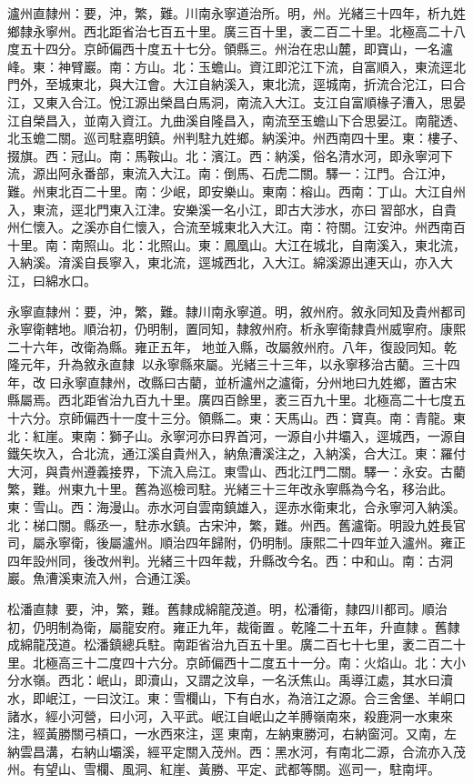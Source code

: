 \begin{pinyinscope}
瀘州直隸州：要，沖，繁，難。川南永寧道治所。明，州。光緒三十四年，析九姓鄉隸永寧州。西北距省治七百五十里。廣三百十里，袤二百二十里。北極高二十八度五十四分。京師偏西十度五十七分。領縣三。州治在忠山麓，即寶山，一名瀘峰。東：神臂巖。南：方山。北：玉蟾山。資江即沱江下流，自富順入，東流逕北門外，至城東北，與大江會。大江自納溪入，東北流，逕城南，折流合沱江，曰合江，又東入合江。悅江源出榮昌白馬洞，南流入大江。支江自富順椽子漕入，思晏江自榮昌入，並南入資江。九曲溪自隆昌入，南流至玉蟾山下合思晏江。南龍透、北玉蟾二關。巡司駐嘉明鎮。州判駐九姓鄉。納溪沖。州西南四十里。東：樓子、掇旗。西：冠山。南：馬鞍山。北：濱江。西：納溪，俗名清水河，即永寧河下流，源出阿永番部，東流入大江。南：倒馬、石虎二關。驛一：江門。合江沖，難。州東北百二十里。南：少岷，即安樂山。東南：榕山。西南：丁山。大江自州入，東流，逕北門東入江津。安樂溪一名小江，即古大涉水，亦曰習部水，自貴州仁懷入。之溪亦自仁懷入，合流至城東北入大江。南：符關。江安沖。州西南百十里。南：南照山。北：北照山。東：鳳凰山。大江在城北，自南溪入，東北流，入納溪。淯溪自長寧入，東北流，逕城西北，入大江。綿溪源出連天山，亦入大江，曰綿水口。

永寧直隸州：要，沖，繁，難。隸川南永寧道。明，敘州府。敘永同知及貴州都司永寧衛轄地。順治初，仍明制，置同知，隸敘州府。析永寧衛隸貴州威寧府。康熙二十六年，改衛為縣。雍正五年，地並入縣，改屬敘州府。八年，復設同知。乾隆元年，升為敘永直隸，以永寧縣來屬。光緒三十三年，以永寧移治古藺。三十四年，改曰永寧直隸州，改縣曰古藺，並析瀘州之瀘衛，分州地曰九姓鄉，置古宋縣屬焉。西北距省治九百九十里。廣四百餘里，袤三百九十里。北極高二十七度五十六分。京師偏西十一度十三分。領縣二。東：天馬山。西：寶真。南：青龍。東北：紅崖。東南：獅子山。永寧河亦曰界首河，一源自小井壩入，逕城西，一源自鐵矢坎入，合北流，通江溪自貴州入，納魚漕溪注之，入納溪，合大江。東：羅付大河，與貴州遵義接界，下流入烏江。東雪山、西北江門二關。驛一：永安。古藺繁，難。州東九十里。舊為巡檢司駐。光緒三十三年改永寧縣為今名，移治此。東：雪山。西：海漫山。赤水河自雲南鎮雄入，逕赤水衛東北，合永寧河入納溪。北：梯口關。縣丞一，駐赤水鎮。古宋沖，繁，難。州西。舊瀘衛。明設九姓長官司，屬永寧衛，後屬瀘州。順治四年歸附，仍明制。康熙二十四年並入瀘州。雍正四年設州同，後改州判。光緒三十四年裁，升縣改今名。西：中和山。南：古洞巖。魚漕溪東流入州，合通江溪。

松潘直隸：要，沖，繁，難。舊隸成綿龍茂道。明，松潘衛，隸四川都司。順治初，仍明制為衛，屬龍安府。雍正九年，裁衛置。乾隆二十五年，升直隸。舊隸成綿龍茂道。松潘鎮總兵駐。南距省治九百五十里。廣二百七十七里，袤二百二十里。北極高三十二度四十六分。京師偏西十二度五十一分。南：火焰山。北：大小分水嶺。西北：岷山，即瀆山，又謂之汶阜，一名沃焦山。禹導江處，其水曰瀆水，即岷江，一曰汶江。東：雪欄山，下有白水，為涪江之源。合三舍堡、羊峒口諸水，經小河營，曰小河，入平武。岷江自岷山之羊膊嶺南來，殺鹿洞一水東來注，經黃勝關弓槓口，一水西來注，逕東南，左納東勝河，右納窗河。又南，左納雲昌溝，右納山壩溪，經平定關入茂州。西：黑水河，有南北二源，合流亦入茂州。有望山、雪欄、風洞、紅崖、黃勝、平定、武都等關。巡司一，駐南坪。


\end{pinyinscope}
